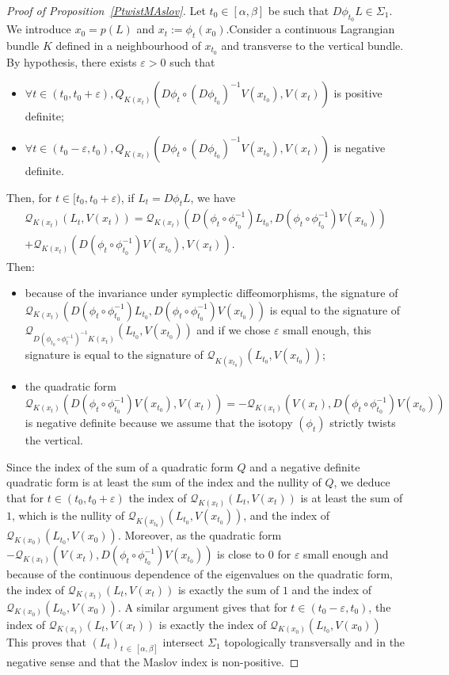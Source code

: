 \documentclass[AHL, Unicode, longabstracts, published]{cedram}
\newcommand*\cq{\mathcal{Q}}
\let\oldforall\forall
\renewcommand*{\forall}{\mathrel{\oldforall}}
\begin{document}
\begin{proof}[Proof of Proposition~\ref{PtwistMAslov}]
Let $t_0\in [\alpha, \beta]$ be such that $D\phi_{t_0}L\in \Sigma_1$. We introduce $x_0=p(L)$ and $x_t:=\phi_t(x_0)$.\linebreak Consider a continuous Lagrangian bundle $K$ defined in a neighbourhood of $x_{t_0}$ and transverse to the vertical bundle. By hypothesis, there exists $\varepsilon>0$ such that
\begin{itemize}
\item $\forall t\in (t_0, t_0+\varepsilon), Q_{K(x_t)}(D\phi_t\circ (D\phi_{t_0})^{-1}V(x_{t_0}), V(x_t))$ is positive definite;
\item $\forall t\in (t_0-\varepsilon, t_0), Q_{K(x_t)}(D\phi_t\circ (D\phi_{t_0})^{-1}V(x_{t_0}), V(x_t))$ is negative definite.
\end{itemize}
Then, for $t\in [t_0, t_0+\varepsilon)$, if $L_t=D\phi_tL$, we have
\begin{multline*}
\cq_{K(x_t)}(L_t, V(x_t))=
\cq_{K(x_t)}\left(D\left(\phi_t\circ \phi_{t_0}^{-1}\right)L_{t_0}, D\left(\phi_t\circ \phi_{t_0}^{-1}\right)V(x_{t_0})\right)\\+\cq_{K(x_t)}\left(D\left(\phi_t\circ \phi_{t_0}^{-1}\right)V(x_{t_0}), V(x_t)\right).
\end{multline*}
Then:
\begin{itemize}
\item because of the invariance under symplectic diffeomorphisms, the signature of $\cq_{K(x_t)}(D(\phi_t\circ \phi_{t_0}^{-1})L_{t_0}, D(\phi_t\circ \phi_{t_0}^{-1})V(x_{t_0}))$ is equal to the signature of $\cq_{D(\phi_{t_0}\circ \phi_{t}^{-1})^{-1}K(x_t)}(L_{t_0}, V(x_{t_0}))$ and if we chose $\varepsilon$ small enough, this signature is equal to the signature of $\cq_{K(x_{t_0})}(L_{t_0}, V(x_{t_0}))$;
\item the quadratic form
\[
\cq_{K(x_t)}\left(D\left(\phi_t\circ \phi_{t_0}^{-1}\right)V(x_{t_0}), V(x_t)\right)=-\cq_{K(x_t)}\left(V(x_t), D\left(\phi_t\circ \phi_{t_0}^{-1}\right)V(x_{t_0})\right)
\]
is negative definite because we assume that the isotopy $(\phi_t)$ strictly twists the vertical.
\end{itemize}
Since the index of the sum of a quadratic form $Q$ and a negative {definite} quadratic form is at least  the sum of the index and the nullity of $Q$, we deduce that for $t\in (t_0, t_0+\varepsilon)$ the index of $\cq_{K(x_t)}(L_t, V(x_t))$ is at least the  sum of $1$, which is the nullity of $\cq_{K(x_{t_0})}(L_{t_0},V(x_{t_0}))$, and the index of $\cq_{K(x_0)}(L_{t_0}, V(x_0))$. { Moreover, as the quadratic form $-\cq_{K(x_t)}(V(x_t), D(\phi_t\circ \phi_{t_0}^{-1})V(x_{t_0}))$ is close to $0$ for $\varepsilon$ small enough and because of the continuous dependence of the eigenvalues on the quadratic form, the index of $\cq_{K(x_t)}(L_t, V(x_t))$ is exactly the sum of $1$ and the index of $\cq_{K(x_0)}(L_{t_0}, V(x_0))$.} A similar argument gives that for $t\in (t_0-\varepsilon, t_0)$, the index of $\cq_{K(x_t)}(L_t, V(x_t))$ is {exactly} the index of $\cq_{K(x_0)}(L_{t_0}, V(x_0))$ This proves that $(L_t)_{t\,\in\,[\alpha, \beta]}$ intersect $\Sigma_1$ { topologically} transversally and in the negative sense and that the Maslov index is non-positive.\newline

\end{proof}
\end{document}
